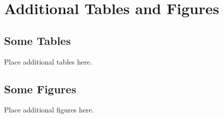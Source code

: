 
\chapter[ADDITIONAL TABLES AND FIGURES]{Additional Tables and Figures}
\newpage
\section{Some Tables}

Place additional tables here.

\section{Some Figures}

Place additional figures here.
